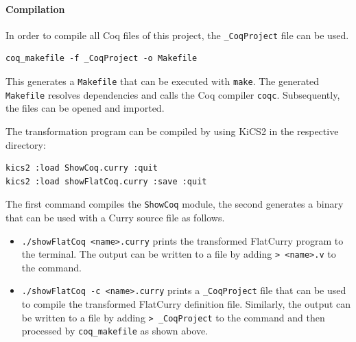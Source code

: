 \documentclass[paper = a4, fleqn, twoside]{scrreprt}
\begin{document}
\paragraph{Compilation}
In order to compile all Coq files of this project, the \texttt{\_CoqProject} file can be used.
\begin{verbatim}
coq_makefile -f _CoqProject -o Makefile
\end{verbatim}
This generates a \texttt{Makefile} that can be executed with \texttt{make}. The generated \texttt{Makefile} resolves dependencies and calls the Coq compiler \texttt{coqc}. Subsequently, the files can be opened and imported.
\par \noindent
The transformation program can be compiled by using KiCS2 in the respective directory:
\begin{verbatim}
kics2 :load ShowCoq.curry :quit
kics2 :load showFlatCoq.curry :save :quit
\end{verbatim}
The first command compiles the \texttt{ShowCoq} module, the second generates a binary that can be used with a Curry source file as follows.
\begin{itemize}
	\item \texttt{./showFlatCoq <name>.curry} prints the transformed FlatCurry program to the terminal. The output can be written to a file by adding \texttt{> <name>.v} to the command.
	\item \texttt{./showFlatCoq -c <name>.curry} prints a \texttt{\_CoqProject} file that can be used to compile the transformed FlatCurry definition file. Similarly, the output can be written to a file by adding \texttt{> _CoqProject} to the command and then processed by \texttt{coq\_makefile} as shown above.
\end{itemize}
\end{document}
